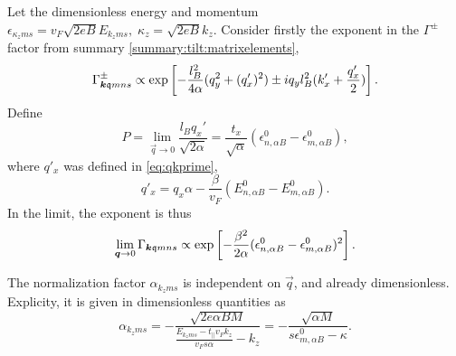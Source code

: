 Let the dimensionless energy and momentum \( \epsilon_{\kappa_z m s} = v_F \sqrt{2 e B} E_{k_{z} m s}, \; \kappa_z = \sqrt{2 e B} k_{z}  \).
Consider firstly the exponent in the \( \Gamma ^{\pm } \) factor from summary \ref{summary:tilt:matrixelements},
\[
  \Gamma^{\pm}_{\bm{k} \mathfrak{q} m n s} \propto
  \exp
  \left[
    - \frac{l_{B}^2}{4 \alpha } (q_{y}^2 + (q' _x)^2) \pm  i q_y l_B^2 (k' _x + \frac{q'_x}{2} )
  \right].
\]
Define
\begin{equation}
P = \lim_{\vec{q} \to 0} \frac{l_B q_x'}{\sqrt{2 \alpha } } = \frac{t_x}{\sqrt{\alpha}} (\epsilon^0_{n, \alpha B} - \epsilon^0_{m, \alpha B}),
\end{equation}
where \( q'_x \) was defined in \cref{eq:qkprime},
\begin{equation*}
  q' _x = q_x \alpha  - \frac{\beta}{v_{F} }( E^0_{n,\alpha B} - E^0_{m, \alpha B} ).
\end{equation*}
In the limit, the exponent is thus
\begin{equation}
  \lim_{\bm{q}\to 0} \Gamma_{\bm{k} \mathfrak{q} m n s} \propto
  \exp
  \left[
    - \frac{\beta ^2 }{2 \alpha} ( \epsilon ^0_{n,\alpha B} - \epsilon ^0_{m, \alpha B} )^2
  \right].
\end{equation}

The normalization factor \( \alpha_{k_z m s} \) is independent on \( \vec{q} \), and already dimensionless.
Explicity, it is given in dimensionless quantities as
\begin{equation}
  \alpha_{k_z m s} =
  -\frac{\sqrt{2 e \alpha B M}}{ \frac{E_{k_{z} m s} - t_{\parallel} v_F k_z}{v_{F} s \alpha } - k_z}
  = -\frac{\sqrt{\alpha M}}{s \epsilon ^{0}_{m, \alpha B} - \kappa }.
\end{equation}

